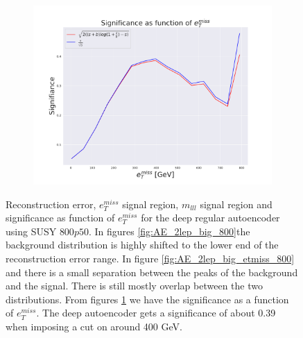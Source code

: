 \begin{figure}[H]
    \begin{subfigure}{.50\textwidth}
        \includegraphics[width=\textwidth]{Figures/AE_testing/big/2lep/significance_etmiss_800p0p050_-1.4833711230716062.pdf}
        \caption{}
        \label{fig:AE_2lep_big_signi_800}
    \end{subfigure}
    \hfill      
    \caption[2lep deep network | $800p50$ | AE]{Reconstruction error, $e_T^{miss}$ signal region, $m_{lll}$ signal region and significance as function of 
    $e_T^{miss}$ for the deep regular autoencoder using SUSY $800p50$. In figures  \ref{fig:AE_2lep_big_800}the background distribution is highly shifted to the lower end of the 
    reconstruction error range. In figure \ref{fig:AE_2lep_big_etmiss_800} and  
    there is a small separation between the peaks of the background
    and the signal. There is still mostly overlap between the two distributions.
    From figures  \ref{fig:AE_2lep_big_signi_800} we have the significance as a function of $e_T^{miss}$. 
    The deep autoencoder gets a significance of about 0.39 when imposing a cut on around 400 GeV.}
    \label{fig:AE_2lep_big_rec_sig_signi_800}
\end{figure}

